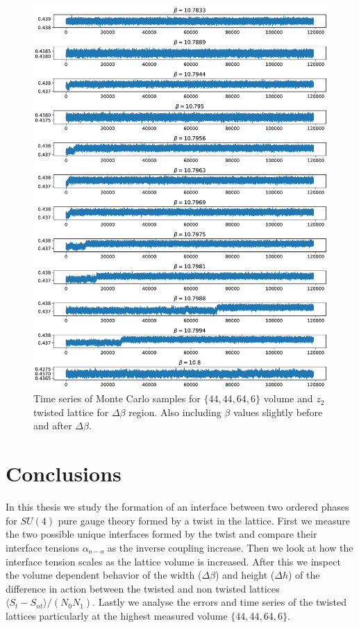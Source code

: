 \documentclass[english,twoside,openright]{UH_TCM_MSc}
\begin{document}
\begin{figure}[!htb]
    \centering
    \includegraphics[width=\textwidth]{final_plots/misc/twist_2_autocorrelation.pdf}
    \caption{Time series of Monte Carlo samples for $\{44,44,64,6\}$ volume and $z_2$ twisted lattice for $\Delta \beta$ region. Also including $\beta$ values slightly before and after $\Delta \beta$.}
    \label{fig:twist_time_series_2}
\end{figure}

\chapter{Conclusions}

In this thesis we study the formation of an interface between two ordered phases for $SU(4)$ pure gauge theory formed by a twist in the lattice. First we measure the two possible unique interfaces formed by the twist and compare their interface tensions $\alpha_{o-o}$ as the inverse coupling increase. Then we look at how the interface tension scales as the lattice volume is increased. After this we inspect the volume dependent behavior of the width ($\Delta \beta$) and height ($\Delta h$) of the difference in action between the twisted and non twisted lattices $\langle S_t - S_{nt} \rangle / (N_0N_1)$. Lastly we analyse the errors and time series of the twisted lattices particularly at the highest measured volume $\{44,44,64,6\}$.
\end{document}

